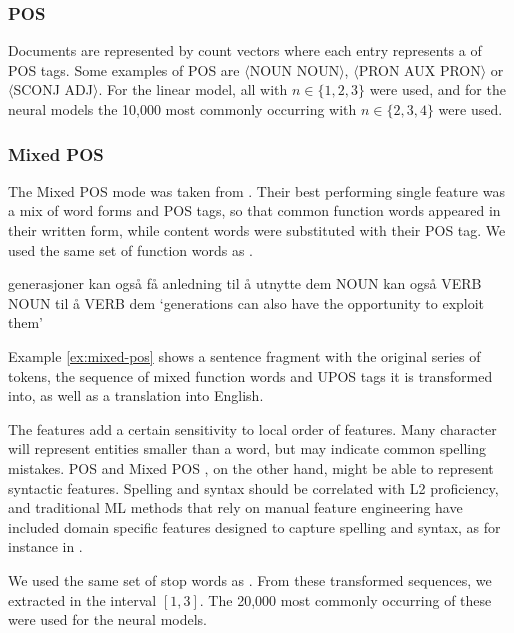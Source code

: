 \subsubsection*{POS \ngrams}

Documents are represented by count vectors where each entry represents a
\ngram of POS tags. Some examples of POS \ngrams are $\langle$NOUN
NOUN$\rangle$, $\langle$PRON AUX PRON$\rangle$ or $\langle$SCONJ
ADJ$\rangle$. For the linear model, all \ngrams with $n\in \{1,2,3\}$ were
used, and for the neural models the 10,000 most commonly occurring \ngrams
with $n\in \{2,3,4\}$ were used.

\subsubsection*{Mixed POS}

The Mixed POS mode was taken from \textcite{malmasi15}. Their best performing
single feature was a mix of word forms and POS tags, so that common function
words appeared in their written form, while content words were substituted
with their POS tag. We used the same set of function words as
\citeauthor{malmasi15}.

\begin{example}
\gll generasjoner kan også få   anledning til å utnytte dem  
     NOUN         kan også VERB NOUN      til å VERB    dem  
\glt `generations can also have the opportunity to exploit them'
\glend
\label{ex:mixed-pos}
\end{example}

Example \ref{ex:mixed-pos} shows a sentence fragment with the original series
of tokens, the sequence of mixed function words and UPOS tags it is
transformed into, as well as a translation into English.

The \ngram features add a certain sensitivity to local order of features.
Many character \ngrams will represent entities smaller than a word, but may
indicate common spelling mistakes. \ac{POS} and Mixed POS \ngrams, on the
other hand, might be able to represent syntactic features. Spelling and
syntax should be correlated with L2 proficiency, and traditional \ac{ML}
methods that rely on manual feature engineering have included domain specific
features designed to capture spelling and syntax, as for instance in
\textcite{vajjala17}.

We used the same set of stop words as \citeauthor{malmasi15}. From these
transformed sequences, we extracted \ngrams in the interval $[1,3]$. The
20,000 most commonly occurring of these were used for the neural models.


